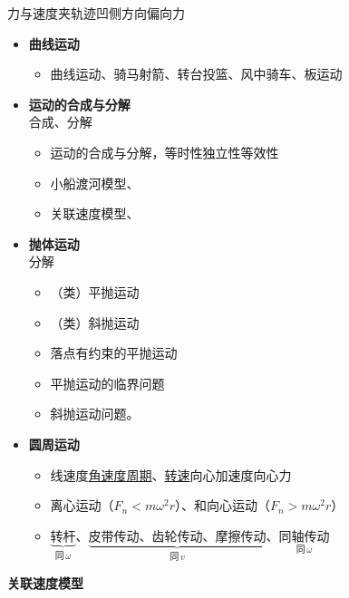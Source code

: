 力与速度夹轨迹\quad 凹侧方向偏向力
\begin{itemize}
  \item \textbf{曲线运动}
  \begin{itemize}
    \item 曲线运动、骑马射箭、转台投篮、风中骑车、板运动
  \end{itemize}
  \item \textbf{运动的合成与分解}\\ 合成、分解
  \begin{itemize}
    \item 运动的合成与分解，\quad 等时性\quad 独立性\quad 等效性
    \item 小船渡河模型、
    \item 关联速度模型、 %
  \end{itemize}
  \item \textbf{抛体运动}\\ 分解
  \begin{itemize}
    \item （类）平抛运动
    \item （类）斜抛运动
    \item 落点有约束的平抛运动
    \item 平抛运动的临界问题
    \item 斜抛运动问题。
  \end{itemize}
  \item \textbf{圆周运动}\\ 
  \begin{itemize}
    \item 线速度\quad \underline{角速度}\quad \underline{周期}、\underline{转速}\quad 向心加速度\quad 向心力
    \item 离心运动（$F_n<m\omega^2 r$）、和向心运动（$F_n>m\omega^2 r$） %
    \item $\underbrace{\text{转杆}}_{\text{同}\,\omega}$、$\underbrace{\text{皮带传动、齿轮传动、摩擦传动}}_{\text{同}\,v}$、$\underset{\text{同}\,\omega}{\text{同轴传动}}$ %
  \end{itemize}
\end{itemize}
\textbf{关联速度模型}

